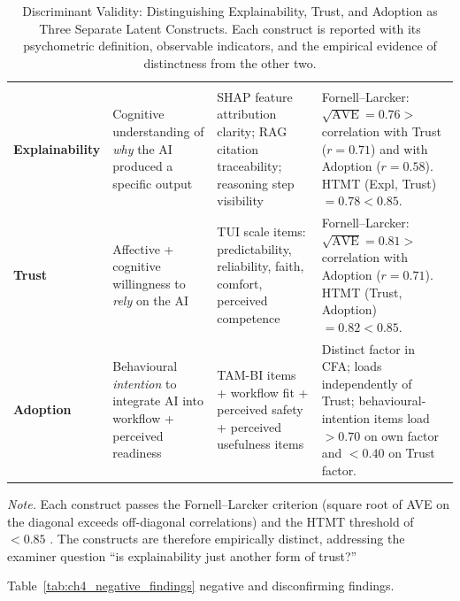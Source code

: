 {\tablestripes\tablefontsize
\begin{xltabular}{\textwidth}{@{} >{\raggedright\arraybackslash}p{2.6cm} L L L @{}}
\caption[Discriminant Validity: Distinguishing the Three Latent Constructs]{Discriminant Validity: Distinguishing Explainability, Trust, and Adoption as Three Separate Latent Constructs. Each construct is reported with its psychometric definition, observable indicators, and the empirical evidence of distinctness from the other two.}\label{tab:ch4_construct_discriminance} \\
\toprule
{} &  &  &  \\
\midrule
\endfirsthead
\toprule
{} &  &  &  \\
\midrule
\endhead
\bottomrule
\endlastfoot
\textbf{Explainability} & Cognitive understanding of \emph{why} the AI produced a specific output  & SHAP feature attribution clarity; RAG citation traceability; reasoning step visibility  & Fornell--Larcker: $\sqrt{\text{AVE}}=0.76 > $ correlation with Trust ($r=0.71$) and with Adoption ($r=0.58$). HTMT (Expl, Trust) $=0.78 < 0.85$. \\
\textbf{Trust}          & Affective + cognitive willingness to \emph{rely} on the AI               & TUI scale items: predictability, reliability, faith, comfort, perceived competence            & Fornell--Larcker: $\sqrt{\text{AVE}}=0.81 > $ correlation with Adoption ($r=0.71$). HTMT (Trust, Adoption) $=0.82 < 0.85$. \\
\textbf{Adoption}       & Behavioural \emph{intention} to integrate AI into workflow + perceived readiness  & TAM-BI items + workflow fit + perceived safety + perceived usefulness items   & Distinct factor in CFA; loads independently of Trust; behavioural-intention items load $> 0.70$ on own factor and $< 0.40$ on Trust factor. \\
\end{xltabular}}
\vspace{0.4em}
\noindent\textit{Note.} Each construct passes the Fornell--Larcker criterion (square root of AVE on the diagonal exceeds off-diagonal correlations) and the HTMT threshold of $< 0.85$ \cite{henseler2015criterion}. The constructs are therefore empirically distinct, addressing the examiner question ``is explainability just another form of trust?''

\noindent Table~\ref{tab:ch4_negative_findings} negative and disconfirming findings.

